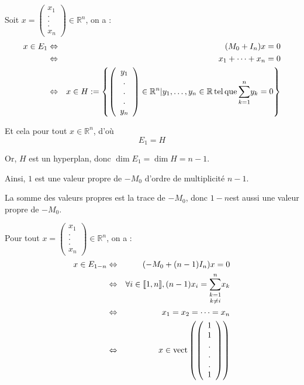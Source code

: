 Soit $x = \left( \begin{array}{c}
  x_1\\
  .\\
  .\\
  .\\
  x_n
\end{array} \right) \in \mathbb{R}^n$, on a :
\begin{eqnarray*}
  x \in E_1 & \Leftrightarrow & (M_0 + I_n) x = 0\\
  & \Leftrightarrow & x_1 + \cdots + x_n = 0\\
  & \Leftrightarrow & x \in H := \left\{ \left( \begin{array}{c}
    y_1\\
    .\\
    .\\
    .\\
    y_n
  \end{array} \right) \in \mathbb{R}^n |  y_1, \ldots, y_n \in
  \mathbb{R} \operatorname{tel} \operatorname{que} \underset{k = 1}{\overset{n}{\sum}} y_k = 0
  \right\}
\end{eqnarray*}


Et cela pour tout $x \in \mathbb{R}^n$, d'o{\`u}
\[ E_1 = H \]


Or, $H$ est un hyperplan, donc $\dim E_1 = \dim H = n - 1$.

Ainsi, $1$ est une valeur propre de $- M_0$ d'ordre de multiplicit{\'e} $n -
1$.

La somme des valeurs propres est la trace de $- M_0$, donc $1 - n$est aussi
une valeur propre de $- M_0$.

Pour tout $x = \left( \begin{array}{c}
  x_1\\
  .\\
  .\\
  .\\
  x_n
\end{array} \right) \in \mathbb{R}^n$, on a :
\begin{eqnarray*}
  x \in E_{1 - n} & \Leftrightarrow & (- M_0 + (n - 1) I_n) x = 0\\
  & \Leftrightarrow & \forall i \in \llbracket 1, n \rrbracket, (n - 1) x_i =
  \overset{n}{\underset{k \not{=} i}{\underset{k = 1}{\sum}}} x_k\\
  & \Leftrightarrow & x_1 = x_2 = \cdots = x_n\\
  & \Leftrightarrow & x \in \operatorname{vect} \left( \left( \begin{array}{c}
    1\\
    1\\
    .\\
    .\\
    .\\
    1
  \end{array} \right) \right)
\end{eqnarray*}



